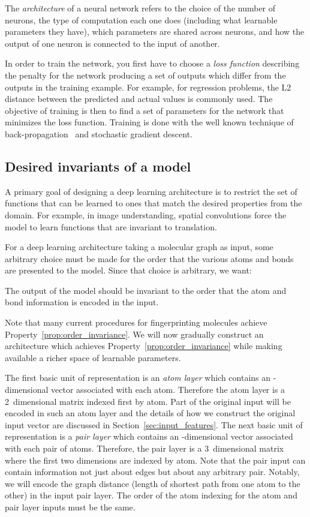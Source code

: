 The \emph{architecture} of a neural network refers to the choice of the number of
neurons, the type of computation each one does (including what learnable
parameters they have), which parameters are shared across neurons, and how the
output of one neuron is connected to the input of another.

In order to train the network, you first have to choose a \emph{loss function}
describing the penalty for the network producing a set of outputs which differ
from the outputs in the training example. For example, for regression
problems, the L2 distance between the predicted and actual values is commonly
used. The objective of training is then to find a set of parameters for the
network that minimizes the loss function. Training is done with the well known
technique of back-propagation~\citep{rumelhart:backprop} and stochastic gradient
descent.

\subsection{Desired invariants of a model}\label{sec:architecture}

A primary goal of designing a deep learning architecture is to restrict the set
of functions that can be learned to ones that match the desired properties from
the domain. For example, in image understanding, spatial convolutions force the
model to learn functions that are invariant to translation.

For a deep learning architecture taking a molecular graph as input, some
arbitrary choice must be made for the order that the various atoms and bonds
are presented to the model. Since that choice is arbitrary, we want:
\begin{property}
  \label{prop:order_invariance}
  The output of the model should be invariant to the order that the atom and
  bond information is encoded in the input.
\end{property}

Note that many current procedures for fingerprinting molecules achieve
Property~\ref{prop:order_invariance}. We will now gradually construct an
architecture which achieves Property~\ref{prop:order_invariance} while
making available a richer space of learnable parameters.

The first basic unit of representation is an \emph{atom layer} which
contains an -dimensional vector associated with each atom. Therefore the
atom layer is a 2~dimensional matrix indexed first by atom. Part of the original
input will be encoded in such an atom layer and the details of how we construct
the original input vector are discussed in Section~\ref{sec:input_features}. The
next basic unit of representation is a \emph{pair layer} which contains an
-dimensional vector associated with each pair of atoms. Therefore, the pair
layer is a 3~dimensional matrix where the first two dimensions are indexed by
atom. Note that the pair input can contain information not just about edges but
about any arbitrary pair. Notably, we will encode the graph distance (length of
shortest path from one atom to the other) in the input pair layer. The order of
the atom indexing for the atom and pair layer inputs must be the same.

